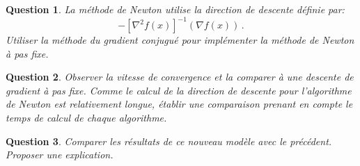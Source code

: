 \documentclass[10pt,a4paper,fleqn]{report}
\newtheorem{question}{Question}
\begin{document}
\begin{question}
La m\'ethode de Newton utilise la direction de descente d\'efinie par:
$$ -[\nabla^2f(x)]^{-1}(\nabla f(x))\,.$$
Utiliser la m\'ethode du gradient conjugu\'e pour impl\'ementer la m\'ethode de Newton \`a pas fixe.
\end{question}

\begin{question}
Observer la vitesse de convergence et la comparer \`a une descente de gradient \`a pas fixe.
Comme le calcul de la direction de descente pour l'algorithme de Newton est relativement longue, \'etablir une comparaison prenant en compte le temps de calcul de chaque algorithme.
\end{question}

\begin{question}
Comparer les r\'esultats de ce nouveau mod\`ele avec le pr\'ec\'edent. Proposer une explication.
\end{question}
\end{document}
